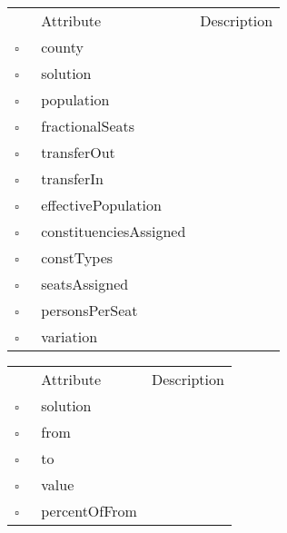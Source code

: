 \begin{table}
\caption{SolCounty  }

\begin{longtable}{llp{8cm}}
& Attribute & Description \\
$\square$\ & county &  \\
$\square$\ & solution &  \\
$\square$\ & population &  \\
$\square$\ & fractionalSeats &  \\
$\square$\ & transferOut &  \\
$\square$\ & transferIn &  \\
$\square$\ & effectivePopulation &  \\
$\square$\ & constituenciesAssigned &  \\
$\square$\ & constTypes &  \\
$\square$\ & seatsAssigned &  \\
$\square$\ & personsPerSeat &  \\
$\square$\ & variation &  \\
\end{longtable}
\label{attr:SolCounty}
\end{table}

\begin{table}
\caption{SolTransfer  }

\begin{longtable}{llp{8cm}}
& Attribute & Description \\
$\square$\ & solution &  \\
$\square$\ & from &  \\
$\square$\ & to &  \\
$\square$\ & value &  \\
$\square$\ & percentOfFrom &  \\
\end{longtable}
\label{attr:SolTransfer}
\end{table}

